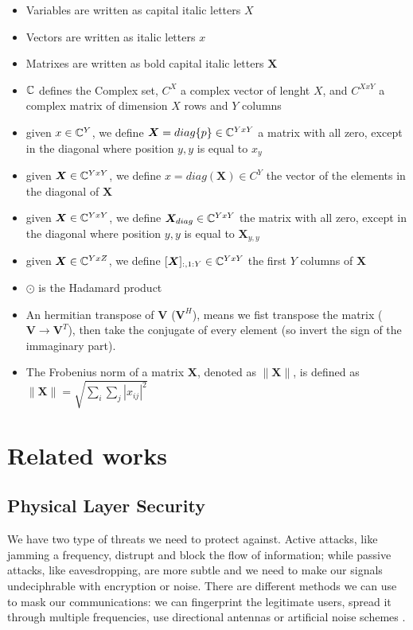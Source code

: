 \begin{itemize}
  \item Variables are written as capital italic letters $X$
  \item Vectors are written as italic letters $x$
  \item Matrixes are written as bold capital italic letters $\bm{X}$
  \item $\mathbb{C}$ defines the Complex set, $C^X$ a complex vector of lenght $X$, and $C^{XxY}$ a complex matrix of dimension $X$ rows and $Y$ columns
  \item given $x \in \mathbb{C}^Y$, we define $\bm{X} = diag\{p\} \in \mathbb{C}^{YxY}$ a matrix with all zero, except in the diagonal where position $y,y$ is equal to $x_y$
  \item given $\bm{X} \in \mathbb{C}^{YxY}$, we define $x = diag(\bm{X}) \in C^Y$ the vector of the elements in the diagonal of $\bm{X}$
  \item given $\bm{X} \in \mathbb{C}^{YxY}$, we define $\bm{X}_{diag} \in \mathbb{C}^{YxY}$ the matrix with all zero, except in the diagonal where position $y,y$ is equal to $\bm{X}_{y,y}$
  \item given $\bm{X} \in \mathbb{C}^{YxZ}$, we define $[\bm{X}]_{:,1:Y} \in \mathbb{C}^{YxY}$ the first $Y$ columns of $\bm{X}$
  \item $\odot$ is the Hadamard product
  \item An hermitian transpose of $\bm{V}$ ($\bm{V}^H$), means we fist transpose the matrix ($\bm{V} \rightarrow \bm{V}^T$), then take the conjugate of every element (so invert the sign of the immaginary part).
  \item The Frobenius norm of a matrix $\bm{X}$, denoted as $\|\bm{X}\|$, is defined as $\|\bm{X}\| = \sqrt{\sum_{i}\sum_{j} |x_{ij}|^2}$
\end{itemize}

\newpage
\section{Related works}
\subsection{Physical Layer Security}

We have two type of threats we need to protect against. Active attacks, like jamming a frequency, distrupt and block the flow of information; while passive attacks, like eavesdropping, are more subtle and we need to make our signals undeciphrable with encryption or noise. There are different methods we can use to mask our communications: we can fingerprint the legitimate users, spread it through multiple frequencies, use directional antennas or artificial noise schemes \cite{5751298}.


